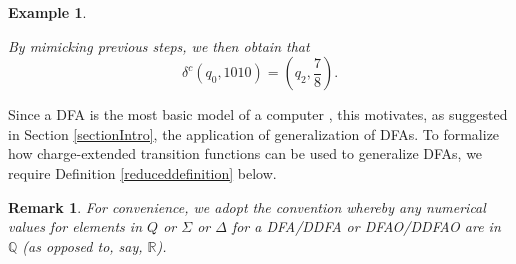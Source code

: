 \documentclass[12pt]{article}
\newtheorem{remark}{Remark}
\newtheorem{example}{Example}
\begin{document}
\begin{example}
\begin{center}
\end{center}
 By mimicking previous steps, we then obtain that 
\begin{equation}\label{displaytuplecharge}
 \delta^{c}(q_0, 1010) = \left( q_2, \frac{7}{8} \right). 
\end{equation}
\end{example}

 Since a DFA is the most basic model of a computer \cite[p.\ 4]{Shallit2009}, this motivates, as suggested in Section \ref{sectionIntro}, 
 the application of generalization 
 of DFAs. To formalize how charge-extended transition functions
 can be used to generalize DFAs, we require Definition \ref{reduceddefinition} below. 

\begin{remark}
 For convenience, we adopt the convention whereby any numerical values for elements in $Q$ or $\Sigma$ or $\Delta$ 
 for a DFA/DDFA or DFAO/DDFAO are in $\mathbb{Q}$ (as opposed to, say, $\mathbb{R}$). 
\end{remark}
\end{document}
